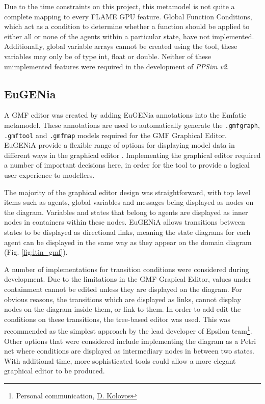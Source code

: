 \documentclass{UoYCSproject}
\begin{document}
Due to the time constraints on this project, this metamodel is not quite a complete mapping to every \gls{FLAME GPU} feature.
Global Function Conditions, which act as a condition to determine whether a function should be applied to either all or none of the agents within a particular state, have not implemented.
Additionally, global variable arrays cannot be created using the tool, these variables may only be of type int, float or double.
Neither of these unimplemented features were required in the development of \textit{PPSim v2}.

\subsection{EuGENia}
A GMF editor was created by adding EuGENia annotations into the Emfatic metamodel.
These annotations are used to automatically generate the \texttt{.gmfgraph}, \texttt{.gmftool} and \texttt{.gmfmap} models required for the GMF Graphical Editor.
EuGENiA provide a flexible range of options for displaying model data in different ways in the graphical editor \cite{epsilon_book}.
Implementing the graphical editor required a number of important decisions here, in order for the tool to provide a logical user experience to modellers.

The majority of the graphical editor design was straightforward, with top level items such as agents, global variables and messages being displayed as nodes on the diagram.
Variables and states that belong to agents are displayed as inner nodes in containers within these nodes.
EuGENiA allows transitions between states to be displayed as directional links, meaning the state diagrams for each agent can be displayed in the same way as they appear on the domain diagram (Fig. \ref{fig:ltin_gmf}).

A number of implementations for transition conditions were considered during development.
Due to the limitations in the GMF Grapical Editor, values under containment cannot be edited unless they are displayed on the diagram.
For obvious reasons, the transitions which are displayed as links, cannot display nodes on the diagram inside them, or link to them.
In order to add edit the conditions on these transitions, the tree-based editor was used.
This was recommended as the simplest approach by the lead developer of Epsilon team\footnote{Personal communication, \href{https://www-users.cs.york.ac.uk/dkolovos/}{D. Kolovos}}.
Other options that were considered include implementing the diagram as a Petri net where conditions are displayed as intermediary nodes in between two states.
With additional time, more sophisticated tools could allow a more elegant graphical editor to be produced.
\end{document}
